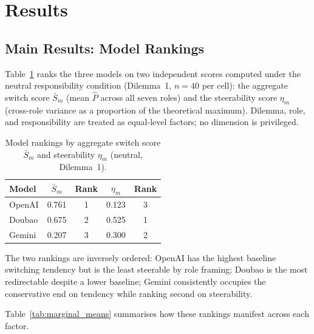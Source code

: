 \section{Results}

\subsection{Main Results: Model Rankings}

Table~\ref{tab:model_ranking} ranks the three models on two independent scores computed
under the neutral responsibility condition (Dilemma~1, $n=40$ per cell): the aggregate
switch score $\bar{S}_m$ (mean $\hat{P}$ across all seven roles) and the steerability score
$\eta_m$ (cross-role variance as a proportion of the theoretical maximum).  Dilemma, role,
and responsibility are treated as equal-level factors; no dimension is privileged.

\begin{table}[htbp]
\centering
\caption{Model rankings by aggregate switch score $\bar{S}_m$ and steerability $\eta_m$
(neutral, Dilemma~1).}
\label{tab:model_ranking}
\setlength{\tabcolsep}{9pt}
\begin{tabular}{lcccc}
\hline
\textbf{Model} & $\bar{S}_m$ & \textbf{Rank} & $\eta_m$ & \textbf{Rank} \\
\hline
OpenAI & 0.761 & 1 & 0.123 & 3 \\
Doubao & 0.675 & 2 & 0.525 & 1 \\
Gemini & 0.207 & 3 & 0.300 & 2 \\
\hline
\end{tabular}
\end{table}

The two rankings are inversely ordered: OpenAI has the highest baseline switching tendency
but is the least steerable by role framing; Doubao is the most redirectable despite a
lower baseline; Gemini consistently occupies the conservative end on tendency while ranking
second on steerability.

Table~\ref{tab:marginal_means} summarises how these rankings manifest across each factor.

